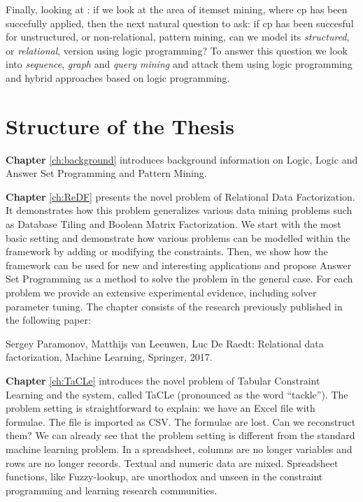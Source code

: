 Finally, looking at \cfour: if we look at the area of itemset mining, where \acrlong{cp}
has been succefully applied, then the next natural question to ask:
if \acrshort{cp} has been succesful for unstructured, or
non-relational, pattern mining, can we model its \textit{structured},
or \textit{relational}, version using logic programming? To answer
this question we look into \textit{sequence}, \textit{graph} and
\textit{query mining} and attack them using logic programming and
hybrid approaches based on logic programming.


\section{Structure of the Thesis}
\textbf{Chapter} \ref{ch:background} introduces background information on Logic, Logic and Answer Set Programming and Pattern Mining.

\textbf{Chapter} \ref{ch:ReDF} presents the novel problem of Relational Data
Factorization. It demonstrates how this problem generalizes various
data mining problems such as Database Tiling and Boolean Matrix
Factorization. We start with the most basic setting and demonstrate
how various problems can be modelled within the framework by adding
or modifying the constraints. Then, we show how the framework can be
used for new and interesting applications and propose Answer Set
Programming as a method to solve the problem in the general case.
For each problem we provide an extensive experimental evidence,
including solver parameter tuning. The chapter consists of the
research previously published in the following paper:

\begin{addmargin}[2em]{2em}

Sergey Paramonov,  Matthijs van Leeuwen, Luc De Raedt: Relational data
factorization, Machine Learning, Springer, 2017.

\end{addmargin}



\textbf{Chapter} \ref{ch:TaCLe} introduces  the novel problem of
Tabular Constraint Learning and the system, called TaCLe (pronounced
as the word ``tackle''). The problem setting is straightforward to
explain: we have an Excel file with formulae. The file is imported as
CSV. The formulae are lost. Can we reconstruct them? We can already 
see that the problem setting is different from the standard machine
learning problem. In a spreadsheet, columns are no longer variables
and rows are no longer records. Textual and numeric data are mixed.
Spreadsheet functions, like Fuzzy-lookup, are unorthodox and unseen in
the constraint programming and learning research communities.

